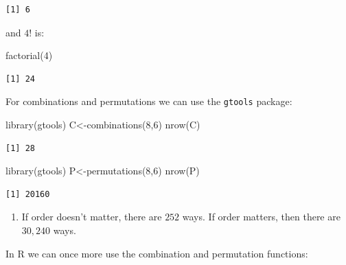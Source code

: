 \documentclass[
  letterpaper,
  DIV=11,
  numbers=noendperiod]{scrreprt}
\newenvironment{Shaded}{\begin{snugshade}}{\end{snugshade}}
\newcommand{\DecValTok}[1]{\textcolor[rgb]{0.68,0.00,0.00}{#1}}
\newcommand{\FunctionTok}[1]{\textcolor[rgb]{0.28,0.35,0.67}{#1}}
\newcommand{\NormalTok}[1]{\textcolor[rgb]{0.00,0.23,0.31}{#1}}
\newcommand{\OtherTok}[1]{\textcolor[rgb]{0.00,0.23,0.31}{#1}}
\providecommand{\tightlist}{%
  \setlength{\itemsep}{0pt}\setlength{\parskip}{0pt}}\usepackage{longtable,booktabs,array}
\begin{document}
\begin{verbatim}
[1] 6
\end{verbatim}

and \(4!\) is:

\begin{Shaded}
\begin{Highlighting}[numbers=left,,]
\FunctionTok{factorial}\NormalTok{(}\DecValTok{4}\NormalTok{)}
\end{Highlighting}
\end{Shaded}

\begin{verbatim}
[1] 24
\end{verbatim}

For combinations and permutations we can use the \texttt{gtools}
package:

\begin{Shaded}
\begin{Highlighting}[numbers=left,,]
\FunctionTok{library}\NormalTok{(gtools)}
\NormalTok{C}\OtherTok{\textless{}{-}}\FunctionTok{combinations}\NormalTok{(}\DecValTok{8}\NormalTok{,}\DecValTok{6}\NormalTok{)}
\FunctionTok{nrow}\NormalTok{(C)}
\end{Highlighting}
\end{Shaded}

\begin{verbatim}
[1] 28
\end{verbatim}

\begin{Shaded}
\begin{Highlighting}[numbers=left,,]
\FunctionTok{library}\NormalTok{(gtools)}
\NormalTok{P}\OtherTok{\textless{}{-}}\FunctionTok{permutations}\NormalTok{(}\DecValTok{8}\NormalTok{,}\DecValTok{6}\NormalTok{)}
\FunctionTok{nrow}\NormalTok{(P)}
\end{Highlighting}
\end{Shaded}

\begin{verbatim}
[1] 20160
\end{verbatim}

\begin{enumerate}
\def\labelenumi{\arabic{enumi}.}
\setcounter{enumi}{1}
\tightlist
\item
  If order doesn't matter, there are \(252\) ways. If order matters,
  then there are \(30,240\) ways.
\end{enumerate}

In R we can once more use the combination and permutation functions:
\end{document}
